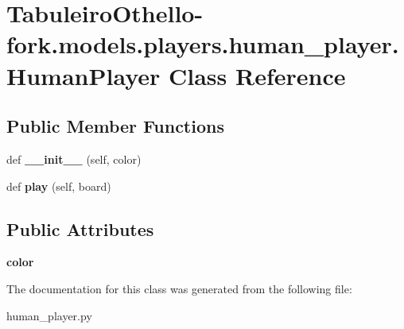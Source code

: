 \hypertarget{class_tabuleiro_othello-fork_1_1models_1_1players_1_1human__player_1_1_human_player}{}\section{Tabuleiro\+Othello-\/fork.models.\+players.\+human\+\_\+player.\+Human\+Player Class Reference}
\label{class_tabuleiro_othello-fork_1_1models_1_1players_1_1human__player_1_1_human_player}
\subsection*{Public Member Functions}
\begin{DoxyCompactItemize}
\item 
\hypertarget{class_tabuleiro_othello-fork_1_1models_1_1players_1_1human__player_1_1_human_player_a7321becef1db95f0cd1e4cce5836d4f6}{}def {\bfseries \+\_\+\+\_\+init\+\_\+\+\_\+} (self, color)\label{class_tabuleiro_othello-fork_1_1models_1_1players_1_1human__player_1_1_human_player_a7321becef1db95f0cd1e4cce5836d4f6}

\item 
\hypertarget{class_tabuleiro_othello-fork_1_1models_1_1players_1_1human__player_1_1_human_player_ad17b64277dffb41a36badb67467e7638}{}def {\bfseries play} (self, board)\label{class_tabuleiro_othello-fork_1_1models_1_1players_1_1human__player_1_1_human_player_ad17b64277dffb41a36badb67467e7638}

\end{DoxyCompactItemize}
\subsection*{Public Attributes}
\begin{DoxyCompactItemize}
\item 
\hypertarget{class_tabuleiro_othello-fork_1_1models_1_1players_1_1human__player_1_1_human_player_aca1174becf715ad080e7c0648ec1fb82}{}{\bfseries color}\label{class_tabuleiro_othello-fork_1_1models_1_1players_1_1human__player_1_1_human_player_aca1174becf715ad080e7c0648ec1fb82}

\end{DoxyCompactItemize}


The documentation for this class was generated from the following file\+:\begin{DoxyCompactItemize}
\item 
human\+\_\+player.\+py\end{DoxyCompactItemize}
